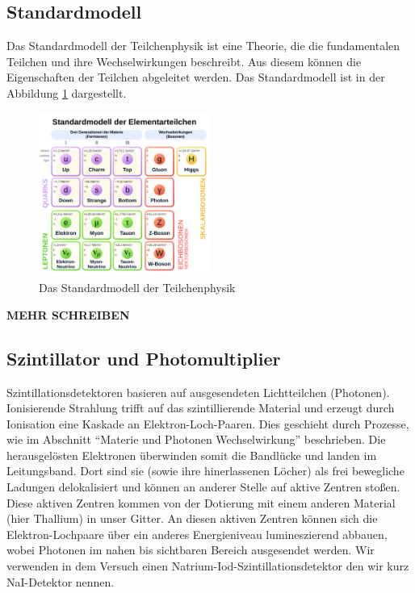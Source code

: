 \documentclass{article}
\begin{document}
\subsection{Standardmodell}
Das Standardmodell der Teilchenphysik ist eine Theorie, die die fundamentalen Teilchen und ihre Wechselwirkungen beschreibt.
Aus diesem können die Eigenschaften der Teilchen abgeleitet werden. Das Standardmodell ist in der Abbildung \ref{fig:Standardmodell} dargestellt.
\begin{figure}[H]
    \centering
    \includegraphics[width=0.5\textwidth]{figures/Standardmodell.png}
    \caption{Das Standardmodell der Teilchenphysik \cite{Standardmodell}}
    \label{fig:Standardmodell} 
\end{figure}
\textbf{\color{red}MEHR SCHREIBEN}

\subsection{Szintillator und Photomultiplier}
Szintillationsdetektoren basieren auf ausgesendeten Lichtteilchen (Photonen). Ionisierende Strahlung trifft auf das szintillierende Material 
und erzeugt durch Ionisation eine Kaskade an Elektron-Loch-Paaren. Dies geschieht durch Prozesse, wie im Abschnitt \enquote{Materie und Photonen Wechselwirkung} 
beschrieben. Die herausgelösten Elektronen überwinden somit die Bandlücke und landen im Leitungsband. Dort sind sie (sowie ihre hinerlassenen Löcher) 
als frei bewegliche Ladungen delokalisiert und können an anderer Stelle auf aktive Zentren stoßen. Diese aktiven Zentren kommen von der Dotierung mit 
einem anderen Material (hier Thallium) in unser Gitter. An diesen aktiven Zentren können sich die Elektron-Lochpaare über ein anderes Energieniveau 
lumineszierend abbauen, wobei Photonen im nahen bis sichtbaren Bereich ausgesendet werden. Wir verwenden in dem Versuch einen 
Natrium-Iod-Szintillationsdetektor den wir kurz NaI-Detektor nennen.
\end{document}
